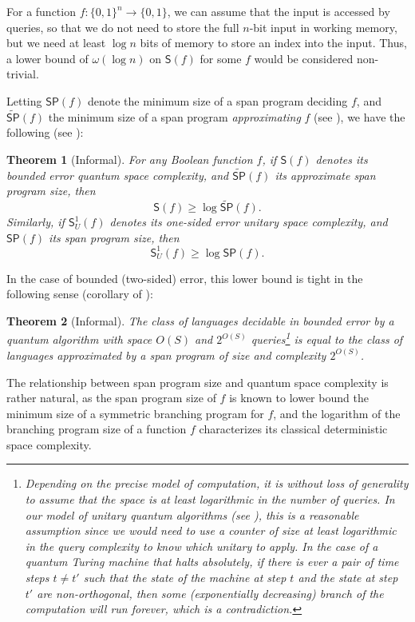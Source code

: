 \documentclass[11pt]{article}
\numberwithin{equation}{section}
\newtheorem{theorem}{Theorem}[section]
\theoremstyle{definition}
\theoremstyle{plain}
\begin{document}
For a function $f:\{0,1\}^n\rightarrow\{0,1\}$, we can assume that the input is accessed by queries, so that we do not need to store the full $n$-bit input in working memory, but we need at least $\log n$ bits of memory to store an index into the input. Thus, a lower bound of $\omega(\log n)$ on $\mathsf{S}(f)$ for some $f$ would be considered non-trivial. 

Letting $\mathsf{SP}(f)$ denote the minimum size of a span program deciding $f$, and $\widetilde{\mathsf{SP}}(f)$ the minimum size of a span program \emph{approximating} $f$ (see ), we have the following (see ):
\begin{theorem}[Informal]\label{thm:span-vs-space}
For any Boolean function $f$, if $\mathsf{S}(f)$ denotes its bounded error quantum space complexity, and $\widetilde{\mathsf{SP}}(f)$ its approximate span program size, then 
$$\mathsf{S}(f) \geq \log\widetilde{\mathsf{SP}}(f).$$
Similarly, if $\mathsf{S}_U^1(f)$ denotes its one-sided error unitary space complexity, and $\mathsf{SP}(f)$ its span program size, then 
$$\mathsf{S}_U^1(f)\geq \log\mathsf{SP}(f).$$
\end{theorem}
In the case of bounded (two-sided) error, this lower bound is tight in the following sense (corollary of ):
\begin{theorem}[Informal]\label{thm:span-vs-space-tight}
The class of languages decidable in bounded error by a quantum algorithm with space $O(S)$ and $2^{O(S)}$ queries\footnote{Depending on the precise model of computation, it is without loss of generality to assume that the space is at least logarithmic in the number of queries. In our model of unitary quantum algorithms (see ), this is a reasonable assumption since we would need to use a counter of size at least logarithmic in the query complexity to know which unitary to apply. In the case of a quantum Turing machine that halts absolutely, if there is ever a pair of time steps $t\neq t'$ such that the state of the machine at step $t$ and the state at step $t'$ are non-orthogonal, then some (exponentially decreasing) branch of the computation will run forever, which is a contradiction.} is equal to the class of languages approximated by a span program of size  and complexity $2^{O(S)}$.
\end{theorem}
The relationship between span program size and quantum space complexity is rather natural, as the span program size of $f$ is known to lower bound the minimum size of a symmetric branching program for $f$, and the logarithm of the branching program size of a function $f$ characterizes its classical deterministic space complexity. 
\end{document}
